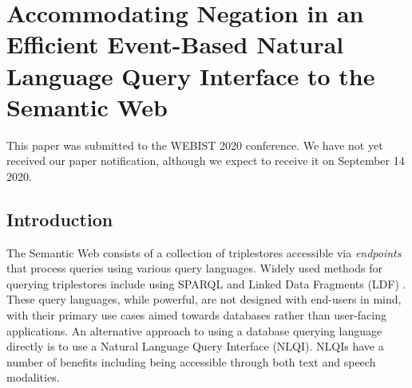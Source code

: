 \documentclass[../main.tex]{subfiles}
\begin{document}
\chapter{Accommodating Negation in an Efficient Event-Based Natural Language Query Interface to the Semantic Web}

\begin{refsection}

\label{chapter:webist2020conf}

This paper was submitted to the WEBIST 2020 conference.  We have not yet received our paper notification,
although we expect to receive it on September 14 2020. %

\section{Introduction}
\label{sec:introduction}


\noindent The Semantic Web consists of a collection of triplestores accessible via \textit{endpoints} that process queries using various query languages.  Widely used methods for querying triplestores include using SPARQL \cite{sparql} and Linked Data Fragments (LDF) \cite{verborgh2014web}.  These query languages, while powerful, are not designed with end-users in mind, with their primary use cases aimed towards databases rather than user-facing applications.
An alternative approach to using a database querying language directly is to use a Natural Language Query Interface (NLQI).  NLQIs have a number of benefits including being accessible through both text and speech modalities.


\end{refsection}
\end{document}
